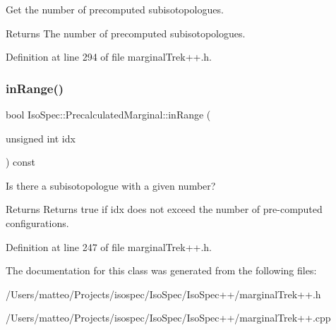 Get the number of precomputed subisotopologues. 

\begin{DoxyReturn}{Returns}
The number of precomputed subisotopologues. 
\end{DoxyReturn}


Definition at line 294 of file marginal\+Trek++.\+h.

\mbox{\label{class_iso_spec_1_1_precalculated_marginal_a942b30ace039f80c50125360be4ed4d2}} 
\subsubsection{\texorpdfstring{in\+Range()}{inRange()}}
{\footnotesize\ttfamily bool Iso\+Spec\+::\+Precalculated\+Marginal\+::in\+Range (\begin{DoxyParamCaption}\item[{unsigned int}]{idx }\end{DoxyParamCaption}) const\hspace{0.3cm}{\ttfamily [inline]}}



Is there a subisotopologue with a given number? 

\begin{DoxyReturn}{Returns}
Returns true if idx does not exceed the number of pre-\/computed configurations. 
\end{DoxyReturn}


Definition at line 247 of file marginal\+Trek++.\+h.



The documentation for this class was generated from the following files\+:\begin{DoxyCompactItemize}
\item 
/\+Users/matteo/\+Projects/isospec/\+Iso\+Spec/\+Iso\+Spec++/marginal\+Trek++.\+h\item 
/\+Users/matteo/\+Projects/isospec/\+Iso\+Spec/\+Iso\+Spec++/marginal\+Trek++.\+cpp\end{DoxyCompactItemize}
